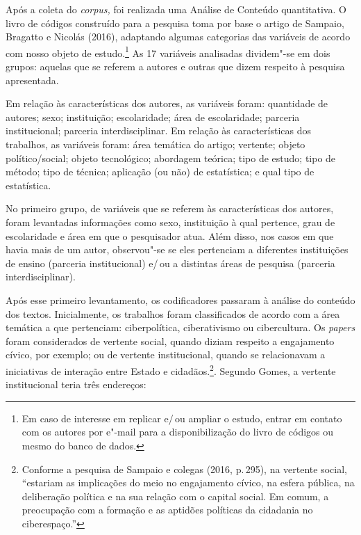 
Após a coleta do \emph{corpus,} foi realizada uma Análise de Conteúdo
quantitativa. O livro de códigos construído para a pesquisa toma por
base o artigo de Sampaio, Bragatto e Nicolás (2016), adaptando algumas
categorias das variáveis de acordo com nosso objeto de estudo.\footnote{Em
  caso de interesse em replicar e/\,ou ampliar o estudo, entrar em contato
  com os autores por e"-mail para a disponibilização do livro de códigos
  ou mesmo do banco de dados.} As 17 variáveis analisadas
dividem"-se em dois grupos: aquelas que se referem a autores e outras
que dizem respeito à pesquisa apresentada.

Em relação às características dos autores, as variáveis foram: quantidade de autores; sexo; instituição; escolaridade; área de escolaridade; parceria institucional; parceria interdisciplinar. 
Em relação às características dos trabalhos, as variáveis foram: área temática do artigo; vertente; objeto político/social; objeto tecnológico; abordagem teórica; tipo de estudo; tipo de método; tipo de técnica; aplicação (ou não) de estatística; e qual tipo de estatística.

No primeiro grupo, de variáveis que se referem às características dos
autores, foram levantadas informações como sexo, instituição à qual
pertence, grau de escolaridade e área em que o pesquisador atua.
Além disso, nos casos em que havia mais de um autor, observou"-se se
eles pertenciam a diferentes instituições de ensino (parceria
institucional) e/\,ou a distintas áreas de pesquisa (parceria
interdisciplinar).

Após esse primeiro levantamento, os codificadores passaram à análise do
conteúdo dos textos. Inicialmente, os trabalhos foram classificados de
acordo com a área temática a que pertenciam: ciberpolítica,
ciberativismo ou cibercultura. Os \emph{papers} foram considerados 
de vertente social, quando diziam respeito a engajamento cívico, por
exemplo; ou de vertente institucional, quando se relacionavam a
iniciativas de interação entre Estado e cidadãos.\footnote{Conforme a
  pesquisa de Sampaio e colegas (2016, p.\,295), na vertente social,
  ``estariam as implicações do meio no engajamento cívico, na esfera
  pública, na deliberação política e na sua relação com o capital
  social. Em comum, a preocupação com a formação e as aptidões políticas
  da cidadania no ciberespaço.''}. Segundo Gomes, a vertente
  institucional teria três endereços: 

